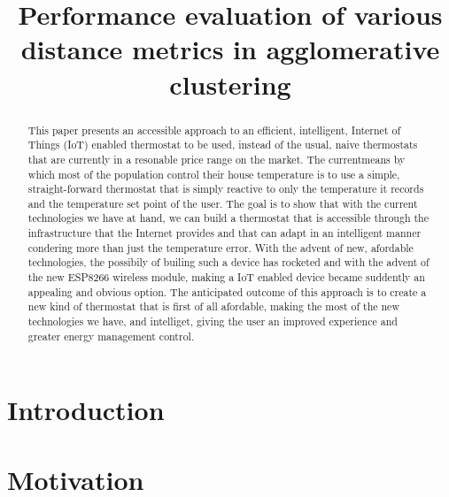 \documentclass[conference]{IEEEtran}
\begin{document}
\title{Performance evaluation of various distance metrics in agglomerative clustering}

\author{
}

\maketitle


\begin{abstract}

This paper presents an accessible approach to an efficient, intelligent, Internet of Things (IoT) enabled
thermostat to be used, instead of the usual, naive thermostats that are currently in a resonable price range
on the market. The currentmeans by which most of the population control their house temperature is to use a
simple, straight-forward thermostat that is simply reactive to only the temperature it records and the
temperature set point of the user. The goal is to show that with the current technologies we have at hand,
we can build a thermostat that is accessible through the infrastructure that the Internet provides and that
can adapt in an intelligent manner condering more than just the temperature error. With the advent of new,
afordable technologies, the possibily of builing such a device has rocketed and with the advent of the new
ESP8266 wireless module, making a IoT enabled device became suddently an appealing and obvious option. The
anticipated outcome of this approach is to create a new kind of thermostat that is first of all afordable,
making the most of the new technologies we have, and intelliget, giving the user an improved experience and
greater energy management control.

\end{abstract}


\section{Introduction}
\label{Introduction}



\section{Motivation}
\label{Motivation}
\end{document}
